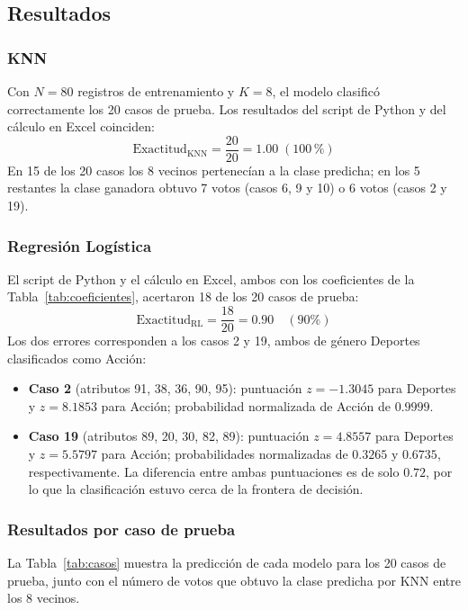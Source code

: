 \documentclass[]{article}
\begin{document}
\subsection{Resultados}

\subsubsection{KNN}

Con $N=80$ registros de entrenamiento y $K=8$, el modelo clasificó correctamente los 20 casos de prueba. Los resultados del script de Python y del cálculo en Excel coinciden:
$$
\text{Exactitud}_{\text{KNN}}=\frac{20}{20}=1.00\;(100\,\text{\%})
$$
En 15 de los 20 casos los 8 vecinos pertenecían a la clase predicha; en los 5 restantes la clase ganadora obtuvo 7 votos (casos 6, 9 y 10) o 6 votos (casos 2 y 19).

\subsubsection{Regresión Logística}

El script de Python y el cálculo en Excel, ambos con los coeficientes de la Tabla~\ref{tab:coeficientes}, acertaron 18 de los 20 casos de prueba:
$$
\text{Exactitud}_{\text{RL}}=\frac{18}{20}=0.90 \quad (90\%)
$$
Los dos errores corresponden a los casos 2 y 19, ambos de género Deportes clasificados como Acción:
\begin{itemize}[nosep]
  \item \textbf{Caso 2} (atributos 91, 38, 36, 90, 95): puntuación $z=-1.3045$ para Deportes y $z=8.1853$ para Acción; probabilidad normalizada de Acción de $0.9999$.
  \item \textbf{Caso 19} (atributos 89, 20, 30, 82, 89): puntuación $z=4.8557$ para Deportes y $z=5.5797$ para Acción; probabilidades normalizadas de $0.3265$ y $0.6735$, respectivamente. La diferencia entre ambas puntuaciones es de solo $0.72$, por lo que la clasificación estuvo cerca de la frontera de decisión.
\end{itemize}

\subsubsection{Resultados por caso de prueba}

La Tabla~\ref{tab:casos} muestra la predicción de cada modelo para los 20 casos de prueba, junto con el número de votos que obtuvo la clase predicha por KNN entre los 8 vecinos.
\end{document}
